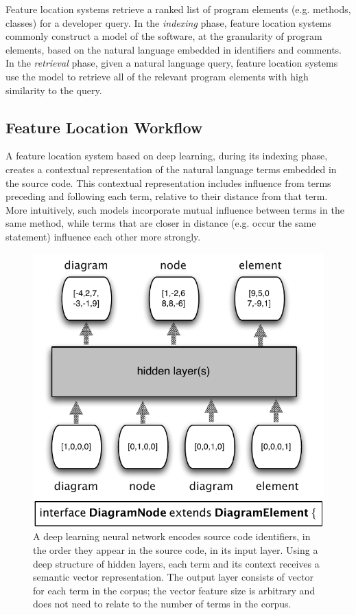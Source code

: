 
%      
%

Feature location systems retrieve a ranked list of program elements
(e.g. methods, classes) for a developer query. In the {\em indexing}
phase, feature location systems commonly construct a model of the
software, at the granularity of program elements, based on the natural
language embedded in identifiers and comments. In the {\em retrieval}
phase, given a natural language query, feature location systems use
the model to retrieve all of the relevant program elements with high
similarity to the query.

\subsection{Feature Location Workflow}

A feature location system based on deep learning, during its indexing
phase, creates a contextual representation of the natural language
terms embedded in the source code. This contextual representation
includes influence from terms preceding and following each term,
relative to their distance from that term. More intuitively, such
models incorporate mutual influence between terms in the same method,
while terms that are closer in distance (e.g. occur the same
statement) influence each other more strongly. 



\begin{figure}[tb]
\centering
\includegraphics[width=.9\columnwidth]{figures/neuralnet.pdf}
\caption{A deep learning neural network encodes source code identifiers,
in the order they appear in the source code, in its input layer. Using
a deep structure of hidden layers, each term and its context receives
a semantic vector representation. The output layer consists of vector
for each term in the corpus; the vector feature size is arbitrary and
does not need to relate to the number of terms in the corpus.}
\label{fig:neuralnet}
\end{figure}



